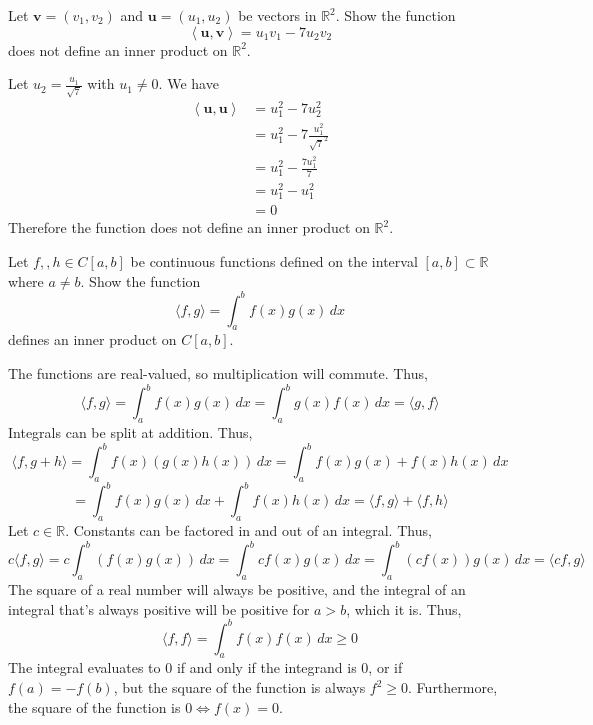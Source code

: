 \begin{exercise}
    Let \(\mathbf{v} =\left( v_1,v_2 \right) \) and \(\mathbf{u} =\left( u_1,u_2 \right) \) be vectors in \(\mathbb{R} ^2\). Show the function
    \[
        \left\langle \mathbf{u} ,\mathbf{v}  \right\rangle =u_1 v_1 -7u_2 v_2
    \]
    does not define an inner product on \(\mathbb{R} ^2\).
    \begin{answer}
        Let \(u_2 = \frac{u_1}{\sqrt{7} }\) with \(u_1 \neq 0\). We have 
        \begin{align*}
            \left\langle \mathbf{u} ,\mathbf{u}  \right\rangle &=u_1^2 -7 u_2^2\\
            &= u_1^2 -7 \frac{u_1^2}{\sqrt{7}^2 }\\
            &= u_1^2 -\frac{7u_1^2}{7}\\
            &= u_1^2 -u_1^2\\
            &=0
        \end{align*}
        Therefore the function does not define an inner product on \(\mathbb{R} ^2\).
    \end{answer}
\end{exercise}
\begin{exercise}
    Let \(f,,h\in C[a,b]\) be continuous functions defined on the interval \([a,b] \subset \mathbb{R}\) where \(a\neq b\). Show the function 
    \[
        \langle f,g \rangle = \int_a^b f(x)g(x)\,dx
    \]
    defines an inner product on \(C[a,b]\).
    \begin{answer}
        The functions are real-valued, so multiplication will commute. Thus,
        \[
            \langle f,g \rangle =\int_a^b f(x)g(x)\,dx =\int_a^b g(x)f(x)\,dx =\langle g,f \rangle 
        \]
        Integrals can be split at addition. Thus,
        \[
            \langle f,g+h \rangle =\int_a^b f(x) (g(x)h(x))\,dx =\int_a^b f(x)g(x) +f(x)h(x)\,dx   
        \]
        \[
            =\int_a^b f(x)g(x)\,dx +\int_a^b f(x)h(x)\,dx =\langle f,g \rangle+\langle f,h \rangle
        \]
        Let \(c\in\mathbb{R} \). Constants can be factored in and out of an integral. Thus,
        \[
            c\langle f,g \rangle =c\int_a^b  \left( f(x)g(x) \right) \,dx=\int_a^b cf(x)g(x)\,dx =\int_a^b (cf(x))g(x)\,dx =\langle cf,g \rangle 
        \]
        The square of a real number will always be positive, and the integral of an integral that's always positive will be positive for \(a>b\), which it is. Thus,
        \[
            \langle f,f \rangle =\int_{a}^b f(x)f(x)\,dx \geq 0
        \]
        The integral evaluates to \(0\) if and only if the integrand is \(0\), or if \(f(a)=-f(b)\), but the square of the function is always \(f^2 \geq 0\). Furthermore, the square of the function is \(0 \iff f(x) =0\).
    \end{answer}
\end{exercise}
